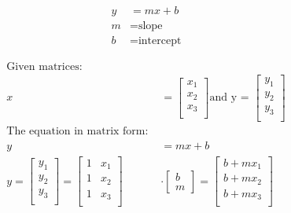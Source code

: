 \documentclass[11pt, a4paper]{article}
\begin{document}
\begin{align*}
    y & = mx + b           \\
    m & = \text{slope}     \\
    b & = \text{intercept}
\end{align*}

\begin{align*}
    \text{Given matrices:}                                                \\
    x                               & =
    \begin{bmatrix}
        x_1 \\
        x_2 \\
        x_3 \\
    \end{bmatrix}
    \text{and y = }
    \begin{bmatrix}
        y_1 \\
        y_2 \\
        y_3 \\
    \end{bmatrix}                                                        \\
    \text{The equation in matrix form: }                                  \\
    y                               & = mx + b                            \\
    y =
    \begin{bmatrix}
        y_1 \\
        y_2 \\
        y_3 \\
    \end{bmatrix}
    =
    \begin{bmatrix}
        1 & x_1 \\
        1 & x_2 \\
        1 & x_3 \\
    \end{bmatrix}
                                    & \cdot
    \begin{bmatrix}
        b \\ m
    \end{bmatrix}
    =
    \begin{bmatrix}
        b + mx_1 \\
        b + mx_2 \\
        b + mx_3 \\
    \end{bmatrix}                                                        \\ \\

\end{align*}
\end{document}
